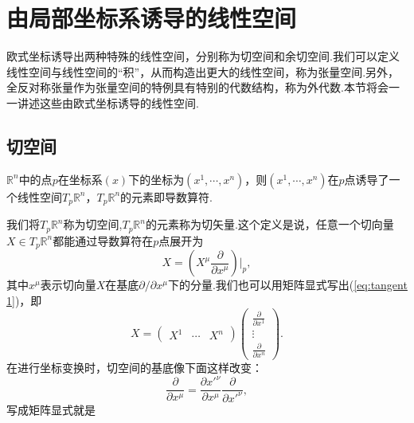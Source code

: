 \section{由局部坐标系诱导的线性空间}
    欧式坐标诱导出两种特殊的线性空间，分别称为切空间和余切空间.我们可以定义线性空间与线性空间的“积”，从而构造出更大的线性空间，称为张量空间.另外，全反对称张量作为张量空间的特例具有特别的代数结构，称为外代数.本节将会一一讲述这些由欧式坐标诱导的线性空间.
    \subsection{切空间}
        \begin{definition}
            $\mathbb{R}^n$中的点$p$在坐标系$(x)$下的坐标为$(x^1,\cdots,x^n)$，则$(x^1,\cdots,x^n)$在$p$点诱导了一个线性空间$T_p\mathbb{R}^n$，$T_p\mathbb{R}^n$的元素即导数算符.
        \end{definition}
        我们将$T_p\mathbb{R}^n$称为切空间,$T_p\mathbb{R}^n$的元素称为切矢量.这个定义是说，任意一个切向量$X\in T_p\mathbb{R}^n$都能通过导数算符在$p$点展开为
        \begin{equation}\label{eq:tangent 1}
            X=\left(X^\mu\frac{\partial}{\partial x^\mu}\right)\Bigg|_p,
        \end{equation}
        其中$x^\mu$表示切向量$X$在基底$\partial/\partial x^\mu$下的分量.我们也可以用矩阵显式写出(\ref{eq:tangent 1})，即
        \begin{equation}\label{eq:tangent 2}
            X=
            \begin{pmatrix}
                X^1&\cdots&X^n	
            \end{pmatrix}
            \begin{pmatrix}
                \frac{\partial}{\partial x^1}\\
                \vdots\\
                \frac{\partial}{\partial x^n}	
            \end{pmatrix}.
        \end{equation}
        在进行坐标变换时，切空间的基底像下面这样改变：
        \begin{equation}\label{eq:tangent 3}
            \frac{\partial}{\partial x^\mu}=\frac{\partial x'^\nu}{\partial x^\mu}\frac{\partial}{\partial x'^\nu},
        \end{equation}
        写成矩阵显式就是
